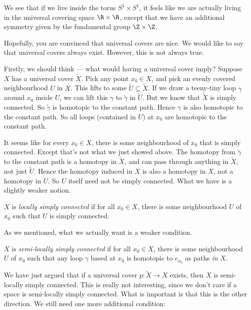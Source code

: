 \documentclass[a4paper]{article}
\begin{document}
We see that if we live inside the torus $S^1 \times S^1$, it feels like we are actually living in the universal covering space $\R \times \R$, except that we have an additional symmetry given by the fundamental group $\Z \times \Z$.

Hopefully, you are convinced that universal covers are nice. We would like to say that universal covers always exist. However, this is not always true.

Firstly, we should think --- what would having a universal cover imply? Suppose $X$ has a universal cover $\tilde{X}$. Pick any point $x_0 \in X$, and pick an evenly covered neighbourhood $U$ in $X$. This lifts to some $\tilde{U} \subseteq \tilde{X}$. If we draw a teeny-tiny loop $\gamma$ around $x_0$ inside $U$, we can lift this $\gamma$ to $\tilde{\gamma}$ in $\tilde{U}$. But we know that $\tilde{X}$ is simply connected. So $\tilde{\gamma}$ is homotopic to the constant path. Hence $\gamma$ is also homotopic to the constant path. So all loops (contained in $U$) at $x_0$ are homotopic to the constant path.

It seems like for every $x_0 \in X$, there is some neighbourhood of $x_0$ that is simply connected. Except that's not what we just showed above. The homotopy from $\tilde{\gamma}$ to the constant path is a homotopy in $\tilde{X}$, and can pass through anything in $\tilde{X}$, not just $\tilde{U}$. Hence the homotopy induced in $X$ is also a homotopy in $X$, not a homotopy in $U$. So $U$ itself need not be simply connected. What we have is a slightly weaker notion.

\begin{defi}
  $X$ is \emph{locally simply connected} if for all $x_0\in X$, there is some neighbourhood $U$ of $x_0$ such that $U$ is simply connected.
\end{defi}

As we mentioned, what we actually want is a weaker condition.
\begin{defi}
  $X$ is \emph{semi-locally simply connected} if for all $x_0 \in X$, there is some neighbourhood $U$ of $x_0$ such that any loop $\gamma$ based at $x_0$ is homotopic to $c_{x_0}$ as paths \emph{in $X$}.
\end{defi}

We have just argued that if a universal cover $p: \tilde{X} \to X$ exists, then $X$ is semi-locally simply connected. This is really not interesting, since we don't care if a space is semi-locally simply connected. What is important is that this is the other direction. We still need one more additional condition:
\end{document}
